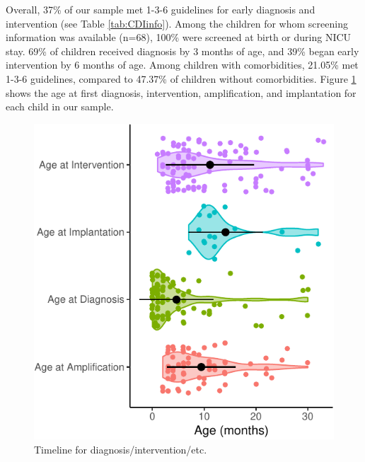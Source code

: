 \documentclass[english,man]{apa6}
\begin{document}
Overall, 37\% of our sample met 1-3-6 guidelines for early diagnosis and intervention (see Table \ref{tab:CDIinfo}). Among the children for whom screening information was available (n=68), 100\% were screened at birth or during NICU stay. 69\% of children received diagnosis by 3 months of age, and 39\% began early intervention by 6 months of age. Among children with comorbidities, 21.05\% met 1-3-6 guidelines, compared to 47.37\% of children without comorbidities. Figure \ref{fig:meets136-timeline} shows the age at first diagnosis, intervention, amplification, and implantation for each child in our sample.

\begin{figure}
\centering
\includegraphics{ELSSP_paper_files/figure-latex/meets136-timeline-1.pdf}
\caption{\label{fig:meets136-timeline}Timeline for diagnosis/intervention/etc.}
\end{figure}
\end{document}
